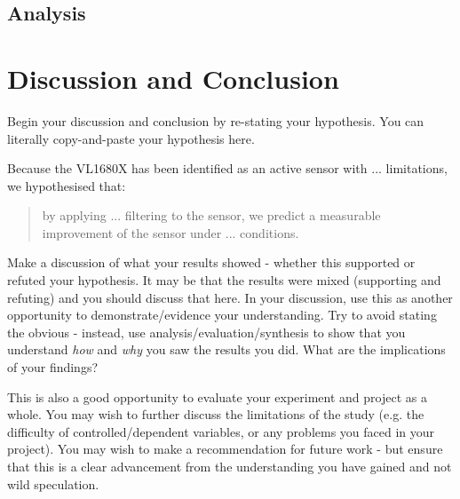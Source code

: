 \documentclass[conference]{IEEEtran}
\begin{document}
\subsection{Analysis}
\label{Analysis}

\section{Discussion and Conclusion}

\label{DiscussionAndConclusion}

Begin your discussion and conclusion by re-stating your hypothesis.  You can literally copy-and-paste your hypothesis here.  

Because the VL1680X has been identified as an active sensor with ... limitations, we hypothesised that:
\begin{quote}
    by applying ... filtering to the sensor, we predict a measurable improvement of the sensor under ... conditions.  
\end{quote}

Make a discussion of what your results showed - whether this supported or refuted your hypothesis.  It may be that the results were mixed (supporting and refuting) and you should discuss that here. In your discussion, use this as another opportunity to demonstrate/evidence your understanding. Try to avoid stating the obvious - instead, use analysis/evaluation/synthesis to show that you understand \emph{how} and \emph{why} you saw the results you did.  What are the implications of your findings?  

This is also a good opportunity to evaluate your experiment and project as a whole.  You may wish to further discuss the limitations of the study (e.g. the difficulty of controlled/dependent variables, or any problems you faced in your project).  You may wish to make a recommendation for future work - but ensure that this is a clear advancement from the understanding you have gained and not wild speculation.


 

\end{document}
